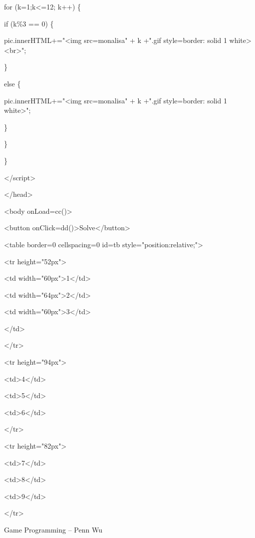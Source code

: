 \documentclass[
]{article}
\begin{document}
for (k=1;k\textless=12; k++) \{

if (k\%3 == 0) \{

pic.innerHTML+="\textless img src=monalisa" + k +".gif
style=\textquotesingle border: solid 1
white\textquotesingle\textgreater\textless br\textgreater";

\}

else \{

pic.innerHTML+="\textless img src=monalisa" + k +".gif
style=\textquotesingle border: solid 1
white\textquotesingle\textgreater";

\}

\}

\}

\textless/script\textgreater{}

\textless/head\textgreater{}

\textless body onLoad=cc()\textgreater{}

\textless button
onClick=dd()\textgreater Solve\textless/button\textgreater{}

\textless table border=0 cellspacing=0 id=tb
style="position:relative;"\textgreater{}

\textless tr height="52px"\textgreater{}

\textless td width="60px"\textgreater1\textless/td\textgreater{}

\textless td width="64px"\textgreater2\textless/td\textgreater{}

\textless td width="60px"\textgreater3\textless/td\textgreater{}

\textless/td\textgreater{}

\textless/tr\textgreater{}

\textless tr height="94px"\textgreater{}

\textless td\textgreater4\textless/td\textgreater{}

\textless td\textgreater5\textless/td\textgreater{}

\textless td\textgreater6\textless/td\textgreater{}

\textless/tr\textgreater{}

\textless tr height="82px"\textgreater{}

\textless td\textgreater7\textless/td\textgreater{}

\textless td\textgreater8\textless/td\textgreater{}

\textless td\textgreater9\textless/td\textgreater{}

\textless/tr\textgreater{}

Game Programming -- Penn Wu
\end{document}
